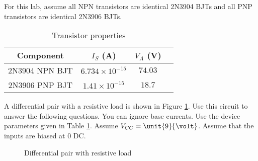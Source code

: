 \documentclass{article}
\begin{document}
\thispagestyle{plain}

\name

For this lab, assume all NPN transistors are identical 2N3904 BJTs and all PNP transistors are identical 2N3906 BJTs.

\begin{table}[!htb]
  \begin{center}
    \begin{tabular}{|c|c|c|c|} \hline
      Component & $I_S$ (A) & $V_A$ (V) \\\hline
      2N3904 NPN BJT & $6.734 \times 10^{-15}$ & $74.03$ \\
      2N3906 PNP BJT & $1.41 \times 10^{-15}$ & $18.7$ \\\hline
    \end{tabular}
    \caption{Transistor properties}
    \label{params}
  \end{center}
\end{table}

A differential pair with a resistive load is shown in Figure \ref{diff}. Use this circuit to answer the following questions. You can ignore base currents. Use the device parameters given in Table \ref{params}. Assume $V_{CC}=\unit{9}{\volt}$. Assume that the inputs are biased at \unit{0}{\volt} DC.

\begin{figure}[!htb]
  
  \centerline{\box\graph}
  \caption{Differential pair with resistive load}
  \label{diff}
\end{figure}
\end{document}
